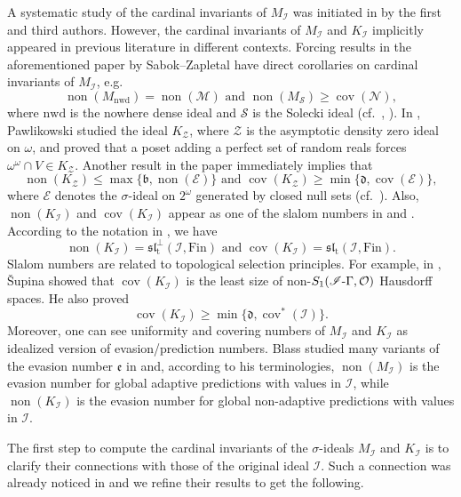 \documentclass[a4paper,12pt]{amsart}
\theoremstyle{definition}
\numberwithin{thm}{section}
\numberwithin{equation}{section}
\newcommand{\bb}{\mathfrak{b}}
\newcommand{\dd}{\mathfrak{d}}
\newcommand{\ee}{\mathfrak{e}}
\newcommand{\m}{\mathcal{M}}
\newcommand{\n}{\mathcal{N}}
\DeclareMathOperator{\non}{non}
\DeclareMathOperator{\cov}{cov}
\newcommand{\I}{\mathscr{I}}
\newcommand{\Z}{\mathcal{Z}}
\newcommand{\nwd}{\mathrm{nwd}}
\newcommand{\Solecki}{\mathcal{S}}
\begin{document}
    A systematic study of the cardinal invariants of $M_\I$ was initiated in \cite{CM25} by the first and third authors.
    However, the cardinal invariants of $M_\I$ and $K_\I$ implicitly appeared in previous literature in different contexts. Forcing results in the aforementioned paper by Sabok--Zapletal \cite{SZ11} have direct corollaries on cardinal invariants of $M_\I$, e.g.\
    \[
    \non(M_\nwd) = \non(\m)\text{ and }\non(M_\Solecki)\geq\cov(\n),
    \]
    where $\nwd$ is the nowhere dense ideal and $\Solecki$ is the Solecki ideal (cf.\ , ). In \cite{Paw00}, Pawlikowski studied the ideal $K_\Z$, where $\Z$ is the asymptotic density zero ideal on $\omega$, and proved that a poset adding a perfect set of random reals forces $\omega^\omega\cap V \in K_\Z$. Another result in the paper immediately implies that
    \[
    \non(K_\Z)\leq\max\{\bb, \non(\mathcal{E})\} \text{ and }\cov(K_\Z)\geq\min\{\dd, \cov(\mathcal{E})\},
    \]
    where $\mathcal{E}$ denotes the $\sigma$-ideal on $2^\omega$ generated by closed null sets (cf.\ ). Also, $\non(K_\I)$ and $\cov(K_\I)$ appear as one of the slalom numbers in \cite{Sup23} and \cite{CGMRS24}. According to the notation in \cite{CGMRS24}, we have
    \[
    \non(K_\I) = \mathfrak{sl}_\mathrm{t}^{\bot}(\I, \mathrm{Fin})\text{ and }\cov(K_\I) = \mathfrak{sl}_\mathrm{t}(\I, \mathrm{Fin}).
    \]
    Slalom numbers are related to topological selection principles. For example, in \cite{Sup23}, \v{S}upina showed that $\cov(K_\I)$ is the least size of non-$S_1(\I\mathchar`-\Gamma, \mathcal{O})$ Hausdorff spaces. He also proved
    \[
    \cov(K_\I) \geq \min\{\dd, \cov^*(\I)\}.
    \]
    Moreover, one can see uniformity and covering numbers of $M_\I$ and $K_\I$ as idealized version of evasion/prediction numbers. Blass studied many variants of the evasion number $\ee$ in \cite{Bla10} and, according to his terminologies, $\non(M_\I)$ is the evasion number for global adaptive predictions with values in $\I$, while $\non(K_\I)$ is the evasion number for global non-adaptive predictions with values in $\I$.
    
    The first step to compute the cardinal invariants of the $\sigma$-ideals $M_\I$ and $K_\I$ is to clarify their connections with those of the original ideal $\I$. Such a connection was already noticed in \cite{CM25} and we refine their results to get the following.
\end{document}
